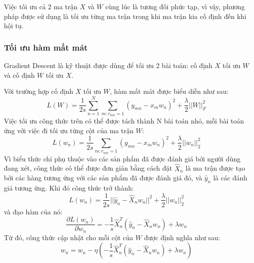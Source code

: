 Việc tối ưu cả 2 ma trận $X$ và $W$ cùng lúc là tương đối phức tạp, vì vậy, phương pháp
được sử dụng là tối ưu từng ma trận trong khi ma trận kia cố định đến khi hội tụ.

\subsubsection{Tối ưu hàm mất mát}
Gradient Descent là kỹ thuật được dùng để tối ưu 2 bài toán: cố định $X$ tối ưu $W$ và
cố định $W$ tối ưu $X$. 

Với trường hợp cố định $X$ tối ưu $W$, hàm mất mát được biểu diễn như sau:
\begin{equation}
    L(W)=\frac{1}{2s}\sum^N_{n=1}\sum_{m:r_{mn}=1}(y_{mn}-x_m w_n)^2+\frac{\lambda}{2}||W||^2_F
\end{equation}
Việc tối ưu công thức trên có thể được tách thành N bài toán nhỏ, mỗi bài toán ứng với việc đi tối ưu từng cột của ma trận $W$:
\begin{equation}
    L(w_n)=\frac{1}{2s}\sum_{m:r_{mn}=1}(y_{mn}-x_m w_n)^2+\frac{\lambda}{2}||w_n||^2_2
\end{equation}
Vì biểu thức chỉ phụ thuộc vào các sản phẩm đã được đánh giá bởi người dùng đang xét, công thức có thể được đơn giản bằng cách đặt $\hat{X}_n$ là ma trận được tạo bởi các hàng
tương ứng với các sản phẩm đã được đánh giá đó, và $\hat{y}_n$ là các đánh giá tương ứng. Khi
đó công thức trở thành:
\begin{equation}
    L(w_n)=\frac{1}{2s}||\hat{y}_n - \hat{X}_n w_n||^2 + \frac{\lambda}{2}||w_n||^2_2
\end{equation}
và đạo hàm của nó: 
\begin{equation}
    \frac{\partial L(w_n)}{\partial w_n}=-\frac{1}{s}\hat{X}_n^T(\hat{y}_n-\hat{X}_n w_n)+\lambda w_n
\end{equation}
Từ đó, công thức cập nhật cho mỗi cột của $W$ được định nghĩa như sau:
\begin{equation}
    w_n = w_n - \eta\left(-\frac{1}{s}\hat{X}_n^T(\hat{y}_n-\hat{X}_n w_n)+\lambda w_n\right)
\end{equation}

